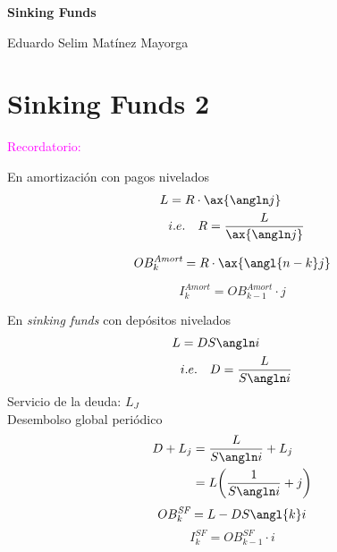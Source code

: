 





\begin{titlingpage} %

    \raggedleft %
	
	\vspace*{\baselineskip} %
	
	\vspace*{0.25\textheight} %
	
    
    \vspace*{0.1\textheight}

    {\Huge{\textbf{Sinking Funds}}}\\[\baselineskip] %
    \vspace*{0.1\textheight}

    
    {\Large Eduardo Selim Matínez Mayorga}\\[\baselineskip]
	
	\vfill

\end{titlingpage}

\thispagestyle{empty}

\chapter*{Sinking Funds 2}
\textcolor{magenta}{Recordatorio:}
\begin{multicols}{2}
En amortización con pagos nivelados
\begin{align*}
    L &= R\cdot \ax{\angln j}\\
    &i.e. \quad R= \frac{L}{\ax{\angln j}}
\end{align*}

$$OB_k^{\textit{Amort}} = R\cdot \ax{\angl{n-k}j}$$

$$I_k^{\textit{Amort}} = OB_{k-1}^{\textit{Amort}}\cdot j$$

\columnbreak

En \textit{sinking funds} con depósitos nivelados
\begin{align*}
    L &= D S\angln i\\
    &i.e.\quad D = \frac{L}{S\angln i}
\end{align*}
Servicio de la deuda: $L_J$\\
Desembolso global periódico
\begin{align*}
    D+L_j &= \frac{L}{S\angln i} + L_j\\
    &= L\bigg(\frac{1}{S\angln i} + j\bigg)
\end{align*}
$$OB_k^{\textit{SF}} = L- DS\angl{k}i$$
$$I_k^{\textit{SF}} = OB_{k-1}^{\textit{SF}}\cdot i$$
\end{multicols}

